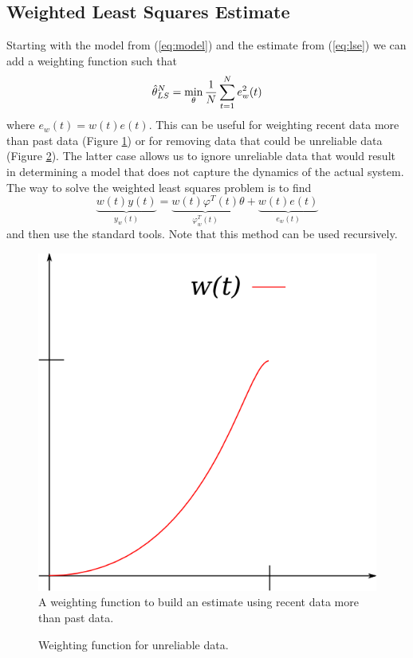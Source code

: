 \documentclass[lecture,12pt,]{pcms-l}
\begin{document}
\subsection{Weighted Least Squares Estimate}
Starting with the model from (\ref{eq:model}) and the estimate from (\ref{eq:lse}) we can add a weighting function such that
$$\hat{\theta}_{LS}^N = \min_\theta \frac{1}{N}\sum_{t=1}^N e_w^2(t)$$
where $e_w(t)=w(t)e(t)$. This can be useful for weighting recent data more than past data (Figure \ref{fig:09wRecent}) or for removing data that could be unreliable data (Figure \ref{fig:09bad}). The latter case allows us to ignore unreliable data that would result in determining a model that does not capture the dynamics of the actual system. The way to solve the weighted least squares problem is to find
$$\underbrace{w(t)y(t)}_{y_w(t)} = \underbrace{w(t)\varphi^T(t)}_{\varphi_w^T(t)}\theta + \underbrace{w(t)e(t)}_{e_w(t)}$$
and then use the standard tools. Note that this method can be used recursively.

\begin{figure}[ht!]
  \centering
  \includegraphics[width=.25\textwidth]{images/09wRecent}
  \caption{A weighting function to build an estimate using recent data more than past data.}
  \label{fig:09wRecent}
\end{figure}

\begin{figure}[ht!]
  \centering
   \hfill
   \hfill
  \caption{Weighting function for unreliable data.}
  \label{fig:09bad}
\end{figure}
\end{document}
